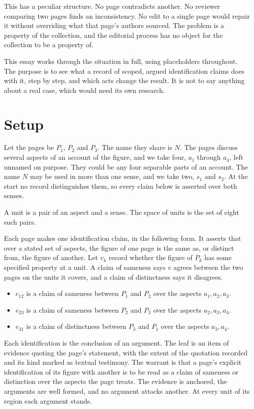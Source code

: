 \documentclass[11pt]{article}
\begin{document}
This has a peculiar structure. No page contradicts another. No reviewer comparing two pages finds an inconsistency. No edit to a single page would repair it without overriding what that page's authors sourced. The problem is a property of the collection, and the editorial process has no object for the collection to be a property of.

This essay works through the situation in full, using placeholders throughout. The purpose is to see what a record of scoped, argued identification claims does with it, step by step, and which acts change the result. It is not to say anything about a real case, which would need its own research.

\section{Setup}\label{sec:setup}

Let the pages be $P_1$, $P_2$ and $P_3$. The name they share is $N$. The pages discuss several aspects of an account of the figure, and we take four, $a_1$ through $a_4$, left unnamed on purpose. They could be any four separable parts of an account. The name $N$ may be used in more than one sense, and we take two, $s_1$ and $s_2$. At the start no record distinguishes them, so every claim below is asserted over both senses.

A unit is a pair of an aspect and a sense. The space of units is the set of eight such pairs.

Each page makes one identification claim, in the following form. It asserts that over a stated set of aspects, the figure of one page is the same as, or distinct from, the figure of another. Let $v_k$ record whether the figure of $P_k$ has some specified property at a unit. A claim of sameness says $v$ agrees between the two pages on the units it covers, and a claim of distinctness says it disagrees.

\begin{itemize}[nosep]
\item $e_{12}$ is a claim of sameness between $P_1$ and $P_2$ over the aspects $a_1,a_2,a_3$.
\item $e_{23}$ is a claim of sameness between $P_2$ and $P_3$ over the aspects $a_2,a_3,a_4$.
\item $e_{31}$ is a claim of distinctness between $P_3$ and $P_1$ over the aspects $a_3,a_4$.
\end{itemize}

Each identification is the conclusion of an argument. The leaf is an item of evidence quoting the page's statement, with the extent of the quotation recorded and its kind marked as textual testimony. The warrant is that a page's explicit identification of its figure with another is to be read as a claim of sameness or distinction over the aspects the page treats. The evidence is anchored, the arguments are well formed, and no argument attacks another. At every unit of its region each argument stands.
\end{document}
